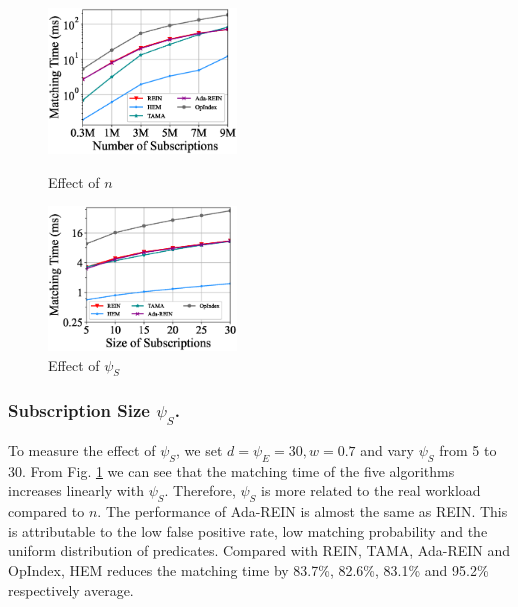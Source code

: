 \documentclass[runningheads]{llncs}
\begin{document}
\begin{figure}[tbp]
\centering
\begin{minipage}[t]{0.48\textwidth}
\centering
\includegraphics[width=5cm]{figures/exp3_n.eps}
\caption{Effect of $n$}
\label{exp3}
\end{minipage}
\begin{minipage}[t]{0.48\textwidth}
\centering
 \includegraphics[width=5cm]{figures/exp4_Ss.eps}
\caption{Effect of $\psi_S$}
\label{exp4}
\end{minipage}
\end{figure}
% 

\subsubsection{Subscription Size $\psi_S$.}
To measure the effect of $\psi_S$, we set $d=\psi_E=30, w=0.7$ and vary $\psi_S$ from 5 to 30. From Fig. \ref{exp4} we can see that the matching time of the five algorithms increases linearly with $\psi_S$. Therefore, $\psi_S$ is more related to the real workload compared to $n$. The performance of Ada-REIN is almost the same as REIN. This is attributable to the low false positive rate, low matching probability and the uniform distribution of predicates. Compared with REIN, TAMA, Ada-REIN and OpIndex, HEM reduces the matching time by 83.7\%, 82.6\%, 83.1\% and 95.2\% respectively average.
\end{document}
